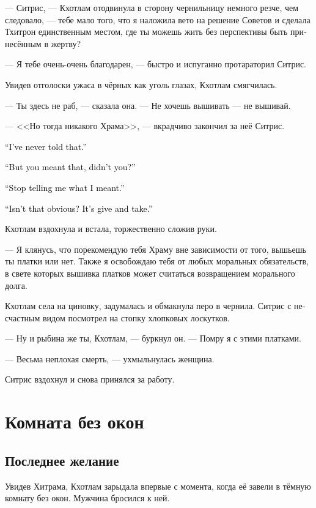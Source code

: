 \documentclass[a4paper,12pt,fleqn]{book}\usepackage{cooltooltips}\usepackage{polyglossia}\setdefaultlanguage{russian}\setotherlanguage{english}\defaultfontfeatures{Ligatures=TeX,Mapping=tex-text} \usepackage{xcolor}\definecolor{lightgray}{HTML}{bbbbbb}\color{lightgray}\newcommand{\ml}[3]{\textenglish{\textcolor{black}{#3}}}
\begin{document}
--- Ситрис, --- Кхотлам отодвинула в сторону чернильницу немного резче, чем следовало, --- тебе мало того, что я наложила вето на решение Советов и сделала Тхитрон единственным местом, где ты можешь жить без перспективы быть принесённым в жертву?

--- Я тебе очень-очень благодарен, --- быстро и испуганно протараторил Ситрис.

Увидев отголоски ужаса в чёрных как уголь глазах, Кхотлам смягчилась.

--- Ты здесь не раб, --- сказала она.
--- Не хочешь вышивать --- не вышивай.

--- <<Но тогда никакого Храма>>, --- вкрадчиво закончил за неё Ситрис.

\ml{$0$}
{--- Я этого не говорила.}
{``I've never told that.''}

\ml{$0$}
{--- Но ты ведь имела это в виду, верно?}
{``But you meant that, didn't you?''}

\ml{$0$}
{--- Хватит говорить мне, что я имела в виду.}
{``Stop telling me what I meant.''}

\ml{$0$}
{--- Разве это не очевидно?}
{``Isn't that obvious?}
\ml{$0$}
{Ты --- мне, я --- тебе.}
{It's give and take.''}

Кхотлам вздохнула и встала, торжественно сложив руки.

--- Я клянусь, что порекомендую тебя Храму вне зависимости от того, вышьешь ты платки или нет.
Также я освобождаю тебя от любых моральных обязательств, в свете которых вышивка платков может считаться возвращением морального долга.

Кхотлам села на циновку, задумалась и обмакнула перо в чернила.
Ситрис с несчастным видом посмотрел на стопку хлопковых лоскутков.

--- Ну и рыбина же ты, Кхотлам, --- буркнул он.
--- Помру я с этими платками.

--- Весьма неплохая смерть, --- ухмыльнулась женщина.

Ситрис вздохнул и снова принялся за работу.

\chapter{Комната без окон}

\section{Последнее желание}

Увидев Хитрама, Кхотлам зарыдала впервые с момента, когда её завели в тёмную комнату без окон.
Мужчина бросился к ней.
\end{document}
